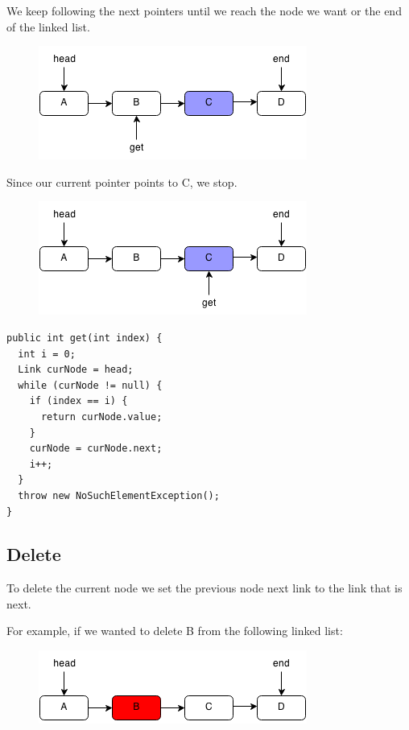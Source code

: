 \documentclass[11pt,oneside]{book}
\makeatletter
\def\maxwidth#1{\ifdim\Gin@nat@width>#1 #1\else\Gin@nat@width\fi}
\makeatother
\begin{document}
We keep following the next pointers until we reach the node we want or the end of the linked list.

\vspace{5px}\begin{figure}[H]\centering
        \includegraphics[width=0.66\maxwidth{\textwidth}]{linkedlistget2.png}
        \end{figure}

Since our current pointer points to C, we stop.

\vspace{5px}\begin{figure}[H]\centering
        \includegraphics[width=0.66\maxwidth{\textwidth}]{linkedlistget3.png}
        \end{figure}

\begin{lstlisting}
public int get(int index) {
  int i = 0;
  Link curNode = head;
  while (curNode != null) {
    if (index == i) {
      return curNode.value;
    }
    curNode = curNode.next;
    i++;
  }
  throw new NoSuchElementException();
}
\end{lstlisting}

\subsection{Delete}

To delete the current node we set the previous node next link to the link that is next.

For example, if we wanted to delete B from the following linked list:

\vspace{5px}\begin{figure}[H]\centering
        \includegraphics[width=0.66\maxwidth{\textwidth}]{linkedlistrem.png}
        \end{figure}
\end{document}
